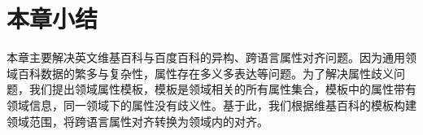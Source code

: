 %
%
%


\section{本章小结}
本章主要解决英文维基百科与百度百科的异构、跨语言属性对齐问题。因为通用领域百科数据的繁多与复杂性，属性存在多义多表达等问题。为了解决属性歧义问题，我们提出领域属性模板，模板是领域相关的所有属性集合，模板中的属性带有领域信息，同一领域下的属性没有歧义性。基于此，我们根据维基百科的模板构建领域范围，将跨语言属性对齐转换为领域内的对齐。

